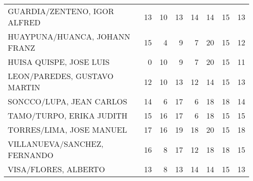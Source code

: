 \begin{table}[]
\begin{tabular}{lrrrrrrr}
		GUARDIA/ZENTENO, IGOR ALFRED        & 13                      & 10                      & 13                      & 14                      & 14                       & 15                      & 13                       \\
		HUAYPUNA/HUANCA, JOHANN FRANZ       & 15                      & 4                       & 9                       & 7                       & 20                       & 15                      & 12                       \\
		HUISA QUISPE, JOSE LUIS             & 0                       & 10                      & 9                       & 7                       & 20                       & 15                      & 11                       \\
		LEON/PAREDES, GUSTAVO MARTIN        & 12                      & 10                      & 13                      & 12                      & 14                       & 15                      & 13                       \\
		SONCCO/LUPA, JEAN CARLOS            & 14                      & 6                       & 17                      & 6                       & 18                       & 18                      & 14                       \\
		TAMO/TURPO, ERIKA JUDITH            & 15                      & 16                      & 17                      & 6                       & 18                       & 15                      & 15                       \\
		TORRES/LIMA, JOSE MANUEL            & 17                      & 16                      & 19                      & 18                      & 20                       & 15                      & 18                       \\
		VILLANUEVA/SANCHEZ, FERNANDO & 16                      & 8                       & 17                      & 12                      & 18                       & 18                      & 15                       \\
		VISA/FLORES, ALBERTO                & 13                      & 8                       & 13                      & 14                      & 14                       & 15                      & 13           \\ \hline           
	\end{tabular}
\end{table}